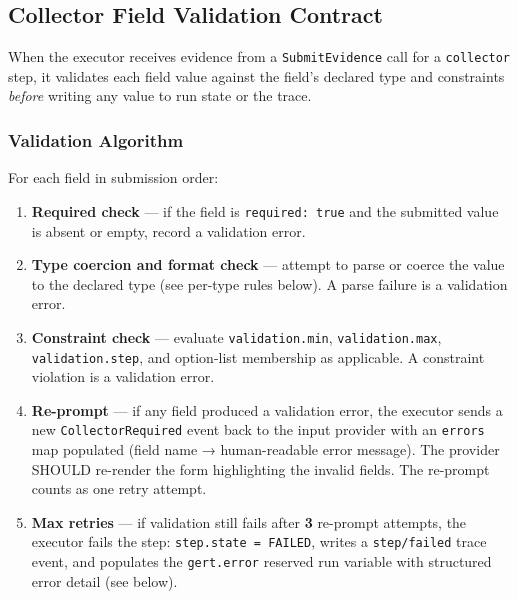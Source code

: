 \subsection{Collector Field Validation Contract}
\label{sec:collector_field_validation}

When the executor receives evidence from a \texttt{SubmitEvidence} call for a
\texttt{collector} step, it validates each field value against the field's declared type
and constraints \emph{before} writing any value to run state or the trace.

\subsubsection*{Validation Algorithm}

For each field in submission order:

\begin{enumerate}
  \item \textbf{Required check} — if the field is \texttt{required: true} and the
        submitted value is absent or empty, record a validation error.
  \item \textbf{Type coercion and format check} — attempt to parse or coerce the value
        to the declared type (see per-type rules below). A parse failure is a validation
        error.
  \item \textbf{Constraint check} — evaluate \texttt{validation.min},
        \texttt{validation.max}, \texttt{validation.step}, and option-list membership as
        applicable. A constraint violation is a validation error.
  \item \textbf{Re-prompt} — if any field produced a validation error, the executor sends
        a new \texttt{CollectorRequired} event back to the input provider with an
        \texttt{errors} map populated (field name → human-readable error message). The
        provider SHOULD re-render the form highlighting the invalid fields. The re-prompt
        counts as one retry attempt.
  \item \textbf{Max retries} — if validation still fails after \textbf{3} re-prompt
        attempts, the executor fails the step: \texttt{step.state = FAILED}, writes a
        \texttt{step/failed} trace event, and populates the \texttt{gert.error} reserved
        run variable with structured error detail (see below).
\end{enumerate}

